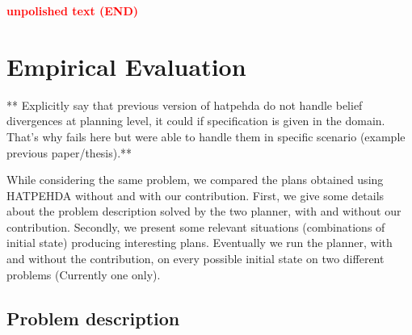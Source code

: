 \documentclass[letterpaper]{article} %
\begin{document}







\textcolor{red}{\textbf{unpolished text (END)}}

\section{Empirical Evaluation}

** Explicitly say that previous version of hatpehda do not handle belief divergences at planning level, it could if specification is given in the domain. That's why fails here but were able to handle them in specific scenario (example previous paper/thesis).**

While considering the same problem, we compared the plans obtained using HATPEHDA without and with our contribution. First, we give some details about the problem description solved by the two planner, with and without our contribution. Secondly, we present some relevant situations (combinations of initial state) producing interesting plans. Eventually we run the planner, with and without the contribution, on every possible initial state on two different problems (Currently one only).  

\subsection{Problem description}
\end{document}

